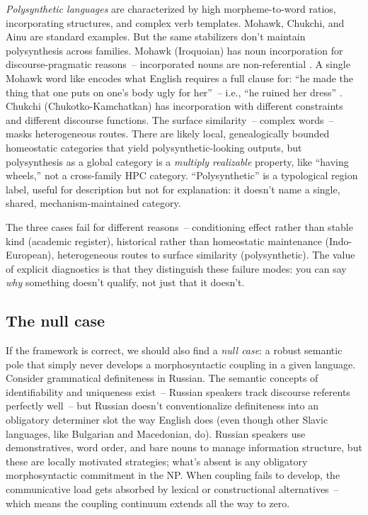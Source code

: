 \emph{Polysynthetic languages} are characterized by high morpheme-to-word ratios, incorporating structures, and complex verb templates. Mohawk, Chukchi, and Ainu are standard examples. But the same stabilizers don't maintain polysynthesis across families. Mohawk (Iroquoian) has noun incorporation for discourse-pragmatic reasons~-- incorporated nouns are non-referential \parencite{mithun1984}. A single Mohawk word like  encodes what English requires a full clause for: \enquote{he made the thing that one puts on one's body ugly for her}~-- i.e., \enquote{he ruined her dress} \parencite[40]{baker1996}. Chukchi (Chukotko-Kamchatkan) has incorporation with different constraints and different discourse functions. The surface similarity~-- complex words~-- masks heterogeneous routes. There are likely local, genealogically bounded homeostatic categories that yield polysynthetic-looking outputs, but polysynthesis as a global category is a \emph{multiply realizable} property, like \enquote{having wheels,} not a cross-family HPC category. \enquote{Polysynthetic} is a typological region label, useful for description but not for explanation: it doesn't name a single, shared, mechanism-maintained category.

The three cases fail for different reasons~-- conditioning effect rather than stable kind (academic register), historical rather than homeostatic maintenance (Indo-European), heterogeneous routes to surface similarity (polysynthetic). The value of explicit diagnostics is that they distinguish these failure modes: you can say \emph{why} something doesn't qualify, not just that it doesn't.

\subsection{The null case}
\label{sec:14:null-case}
If the framework is correct, we should also find a \emph{null case}: a robust semantic pole that simply never develops a morphosyntactic coupling in a given language. Consider grammatical definiteness in Russian. The semantic concepts of identifiability and uniqueness exist~-- Russian speakers track discourse referents perfectly well~-- but Russian doesn't conventionalize definiteness into an obligatory determiner slot the way English does (even though other Slavic languages, like Bulgarian and Macedonian, do). Russian speakers use demonstratives, word order, and bare nouns to manage information structure, but these are locally motivated strategies; what's absent is any obligatory morphosyntactic commitment in the NP. When coupling fails to develop, the communicative load gets absorbed by lexical or constructional alternatives~-- which means the coupling continuum extends all the way to zero.

